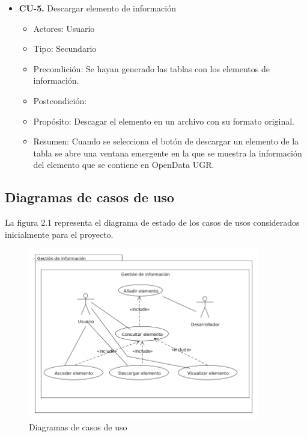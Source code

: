 \begin{itemize}
 \item \textbf{CU-5.} Descargar elemento de información
 \begin{itemize}
  \item Actores: Usuario
  \item Tipo: Secundario
  \item Precondición: Se hayan generado las tablas con los elementos de información.
  \item Postcondición: 
  \item Propósito: Descagar el elemento en un archivo con su formato original.
  \item Resumen: Cuando se selecciona el botón de descargar un elemento de la tabla se abre una ventana emergente en la que se
  muestra la información del elemento que se contiene en OpenData UGR.
 \end{itemize}
\end{itemize}

\subsection{Diagramas de casos de uso}

La figura 2.1 representa el diagrama de estado de los casos de usos considerados inicialmente para el proyecto.

\begin{figure}[htb]
  \begin{center}
  \includegraphics[width=0.9\textwidth]{imagenes/diagrama_casos_uso.png}
  \end{center}
  \caption[Casos de uso]{Diagramas de casos de uso}
\end{figure}